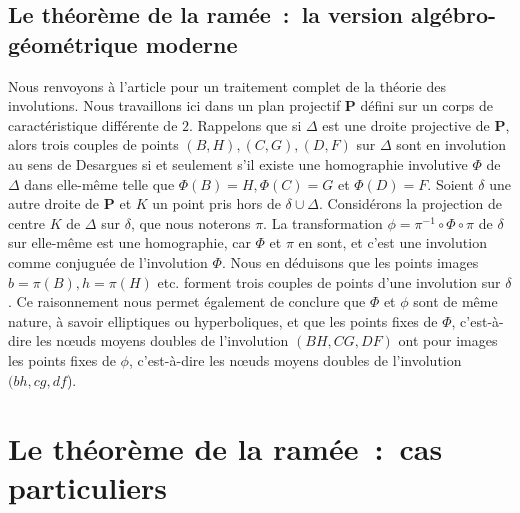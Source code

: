 \documentclass[12pt, a4paper]{article}
\newcommand{\mathbb}{\mathbf}
\newcommand{\PP}{\mathbb{P}}
\begin{document}
\subsection{Le théorème de la ramée~:~la version algébro-géométrique moderne}
Nous renvoyons à l'article \cite{anglade-briend-1} pour un traitement complet de la théorie des involutions. Nous travaillons ici dans un plan projectif $\PP$ défini sur un corps de caractéristique différente de $2$. Rappelons que si $\Delta$ est une droite projective de $\PP$, alors trois couples de points $(B,H), (C,G), (D,F)$ sur $\Delta$ sont en involution au sens de Desargues si et seulement s'il existe une homographie involutive $\Phi$ de $\Delta$ dans elle-même telle que $\Phi(B)=H, \Phi(C)=G$ et $\Phi(D)=F$. Soient $\delta$ une autre droite de $\PP$ et $K$ un point pris hors de $\delta\cup\Delta$. Considérons la projection de centre $K$ de $\Delta$ sur $\delta$, que nous noterons $\pi$. La transformation $\phi=\pi^{-1}\circ\Phi\circ\pi$ de $\delta$ sur elle-même est une homographie, car $\Phi$ et $\pi$ en sont, et c'est une involution comme conjuguée de l'involution $\Phi$. Nous en déduisons que les points images $b=\pi(B), h=\pi(H)$ etc. forment trois couples de points d'une involution sur $\delta$. Ce raisonnement nous permet également de conclure que $\Phi$ et $\phi$ sont de même nature, à savoir elliptiques ou hyperboliques, et que les points fixes de $\Phi$, c'est-à-dire les n{\oe}uds moyens doubles de l'involution $(BH,CG,DF)$ ont pour images les points fixes de $\phi$, c'est-à-dire les n{\oe}uds moyens doubles de l'involution $(bh,cg,df$). 
\section{Le théorème de la ramée~:~cas particuliers}
\end{document}
